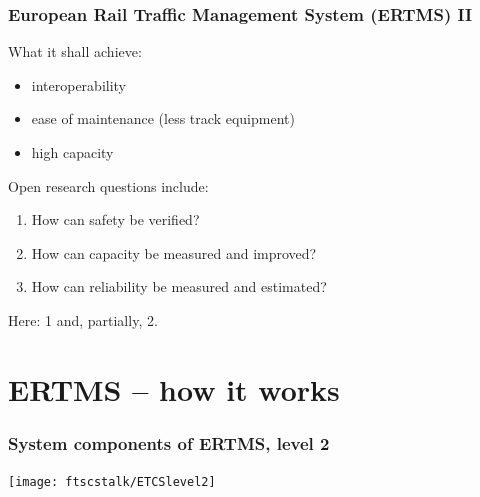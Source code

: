 \documentclass{beamer}
\begin{document}
\begin{frame}

\frametitle{European Rail Traffic Management System (ERTMS) II}

What it shall achieve:
\begin{itemize}

\item 
interoperability

\item
ease of maintenance (less track equipment)

\item 
high capacity

\end{itemize}

\bigskip\bigskip

Open research questions include:
\begin{enumerate}

\item
How can safety be verified? 

\item
How can capacity be measured and improved?

\item
How can reliability be measured and estimated?

\end{enumerate}

Here: 1 and, partially, 2.

\end{frame}

\section{ERTMS -- how it works}



\begin{frame}
\frametitle{System components of ERTMS, level 2}
\texttt{[image: ftscstalk/ETCSlevel2]}
\end{frame}
\end{document}
